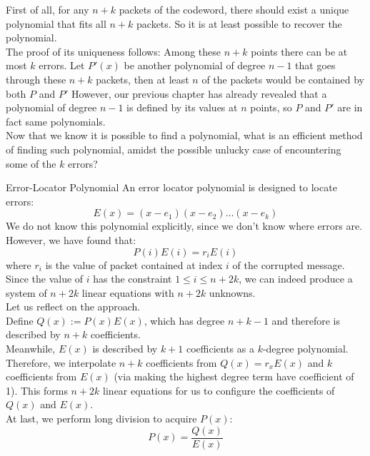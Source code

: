 First of all, for any $n + k$ packets of the codeword, there should exist a unique polynomial that fits all $n + k$ packets. So it is at least possible to recover the polynomial. \\
The proof of its uniqueness follows:
Among these $n + k$ points there can be at most $k$ errors. Let $P'(x)$ be another polynomial of degree $n - 1$ that goes through these $n + k$ packets, then at least $n$ of the packets would be contained by both $P$ and $P'$ However, our previous chapter has already revealed that a polynomial of degree $n - 1$ is defined by its values at $n$ points, so $P$ and $P'$ are in fact same polynomials. \\
Now that we know it is possible to find a polynomial, what is an efficient method of finding such polynomial, amidst the possible unlucky case of encountering some of the $k$ errors?
\begin{ln-theorem}{Error-Locator Polynomial}{}
    An error locator polynomial is designed to locate errors:
    \[E(x) = (x - e_1)(x - e_2)\dots(x - e_k)\]
    We do not know this polynomial explicitly, since we don't know where errors are. \\
    However, we have found that:
    \[P(i)E(i) = r_i E(i)\]
    where $r_i$ is the value of packet contained at index $i$ of the corrupted message. \\
    Since the value of $i$ has the constraint $1 \leq i \leq n + 2k$, we can indeed produce a system of $n + 2k$ linear equations with $n + 2k$ unknowns. \\

    Let us reflect on the approach. \\
    Define $Q(x) := P(x)E(x)$, which has degree $n + k - 1$ and therefore is described by $n + k$ coefficients. \\
    Meanwhile, $E(x)$ is described by $k + 1$ coefficients as a $k$-degree polynomial. \\
    Therefore, we interpolate $n + k$ coefficients from $Q(x) = r_x E(x)$ and $k$ coefficients from $E(x)$ (via making the highest degree term have coefficient of 1). This forms $n + 2k$ linear equations for us to configure the coefficients of $Q(x)$ and $E(x)$. \\
    At last, we perform long division to acquire $P(x)$:
    \[P(x) = \frac{Q(x)}{E(x)}\] 
\end{ln-theorem}

